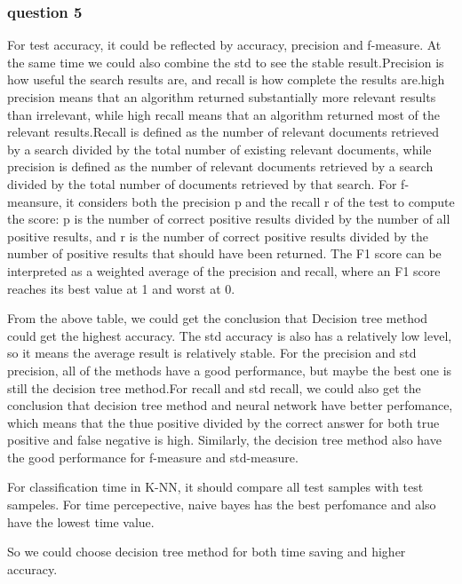 \documentclass[]{article}
\begin{document}
\subsubsection{question 5}
For test accuracy, it could be reflected by accuracy, precision and f-measure. At the same time we could also combine the std to see the stable result.Precision is how useful the search results are, and recall is how complete the results are.high precision means that an algorithm returned substantially more relevant results than irrelevant, while high recall means that an algorithm returned most of the relevant results.Recall is defined as the number of relevant documents retrieved by a search divided by the total number of existing relevant documents, while precision is defined as the number of relevant documents retrieved by a search divided by the total number of documents retrieved by that search. For f-meansure, it considers both the precision p and the recall r of the test to compute the score: p is the number of correct positive results divided by the number of all positive results, and r is the number of correct positive results divided by the number of positive results that should have been returned. The F1 score can be interpreted as a weighted average of the precision and recall, where an F1 score reaches its best value at 1 and worst at 0.


From the above table, we could get the conclusion that Decision tree method could get the highest accuracy. The std accuracy is also has a relatively low level, so it means the average result is relatively stable. For the precision and std precision, all of the methods have a good performance, but maybe the best one is still the decision tree method.For recall and std recall, we could also get the conclusion that decision tree method and neural network have better perfomance, which means that the thue positive divided by the correct answer for both true positive and false negative is high. Similarly, the decision tree method also have the good performance for f-measure and std-measure.

For classification time in K-NN, it should compare all test samples with test sampeles. For time percepective, naive bayes has the best perfomance and also have the lowest time value. 

So we could choose decision tree method for both time saving and higher accuracy. 

\end{document}
